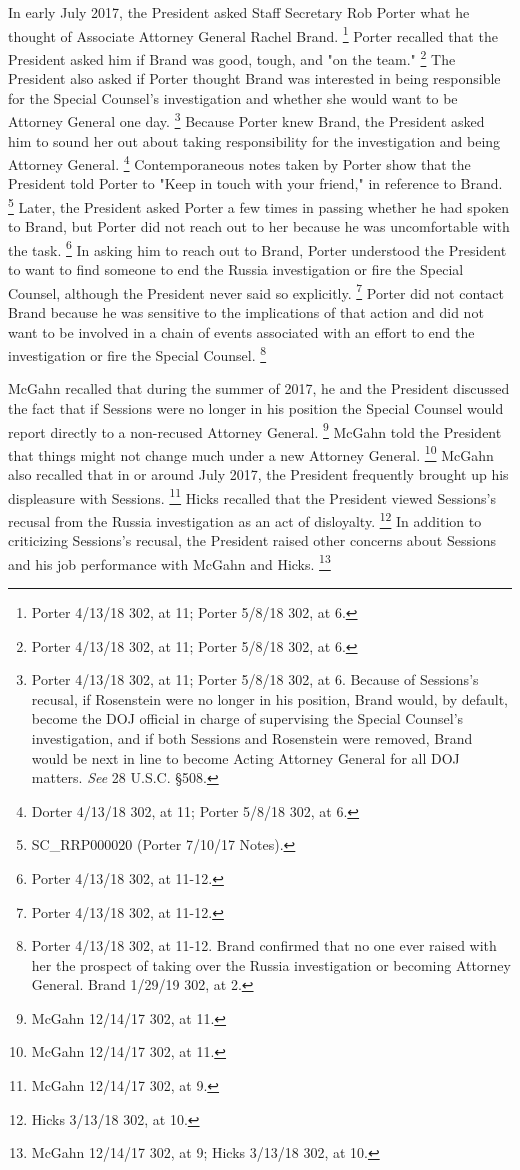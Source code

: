 In early July 2017, the President asked Staff Secretary Rob Porter what he thought of Associate Attorney General Rachel Brand.%
\footnote{Porter 4/13/18 302, at 11;
Porter 5/8/18 302, at 6.}
Porter recalled that the President asked him if Brand was good, tough, and "on the team."%
\footnote{Porter 4/13/18 302, at 11;
Porter 5/8/18 302, at 6.}
The President also asked if Porter thought Brand was interested in being responsible for the Special Counsel's investigation and whether she would want to be Attorney General one day.%
\footnote{Porter 4/13/18 302, at 11;
Porter 5/8/18 302, at 6.
Because of Sessions’s recusal, if Rosenstein were no longer in his position, Brand would, by default, become the DOJ official in charge of supervising the Special Counsel’s investigation, and if both Sessions and Rosenstein were removed, Brand would be next in line to become Acting Attorney General for all DOJ matters.
\textit{See} 28 U.S.C. \S 508.}
Because Porter knew Brand, the President asked him to sound her out about taking responsibility for the investigation and being Attorney General.%
\footnote{Dorter 4/13/18 302, at 11;
Porter 5/8/18 302, at 6.}
Contemporaneous notes taken by Porter show that the President told Porter to "Keep in touch with your friend," in reference to Brand.%
\footnote{SC\_RRP000020 (Porter 7/10/17 Notes).}
Later, the President asked Porter a few times in passing whether he had spoken to Brand, but Porter did not reach out to her because he was uncomfortable with the task.%
\footnote{Porter 4/13/18 302, at 11-12.}
In asking him to reach out to Brand, Porter understood the President to want to find someone to end the Russia investigation or fire the Special Counsel, although the President never said so explicitly.%
\footnote{Porter 4/13/18 302, at 11-12.}
Porter did not contact Brand because he was sensitive to the implications of that action and did not want to be involved in a chain of events associated with an effort to end the investigation or fire the Special Counsel.%
\footnote{Porter 4/13/18 302, at 11-12.
Brand confirmed that no one ever raised with her the prospect of taking over the Russia investigation or becoming Attorney General.
Brand 1/29/19 302, at 2.}

McGahn recalled that during the summer of 2017, he and the President discussed the fact that if Sessions were no longer in his position the Special Counsel would report directly to a non-recused Attorney General.%
\footnote{McGahn 12/14/17 302, at 11.}
McGahn told the President that things might not change much under a new Attorney General.%
\footnote{McGahn 12/14/17 302, at 11.}
McGahn also recalled that in or around July 2017, the President frequently brought up his displeasure with Sessions.%
\footnote{McGahn 12/14/17 302, at 9.}
Hicks recalled that the President viewed Sessions's recusal from the Russia investigation as an act of disloyalty.%
\footnote{Hicks 3/13/18 302, at 10.}
In addition to criticizing Sessions's recusal, the President raised other concerns about Sessions and his job performance with McGahn and Hicks.%
\footnote{McGahn 12/14/17 302, at 9;
Hicks 3/13/18 302, at 10.}


